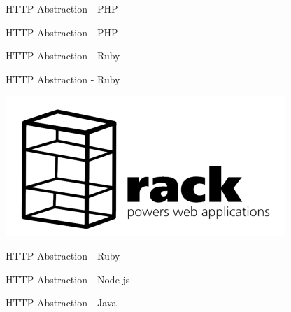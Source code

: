 \begin{frame}[fragile]{HTTP Abstraction - PHP}
  \begin{center}
    
  \end{center}
\end{frame}
\begin{frame}[fragile]{HTTP Abstraction - PHP}
  \begin{center}
    
  \end{center}
\end{frame}

\begin{frame}[fragile]{HTTP Abstraction - Ruby}
  \begin{center}
    
  \end{center}
\end{frame}

\begin{frame}[fragile]{HTTP Abstraction - Ruby}
  \begin{center}
    \includegraphics[width=\textwidth,keepaspectratio]{sources/images/rack-logo.png}
  \end{center}
\end{frame}

\begin{frame}[fragile]{HTTP Abstraction - Ruby}
  \begin{center}
    
  \end{center}
\end{frame}


\begin{frame}[fragile]{HTTP Abstraction - Node js}
  \begin{center}
    
  \end{center}
\end{frame}


\begin{frame}[fragile]{HTTP Abstraction - Java}
  \begin{center}
    
  \end{center}
\end{frame}